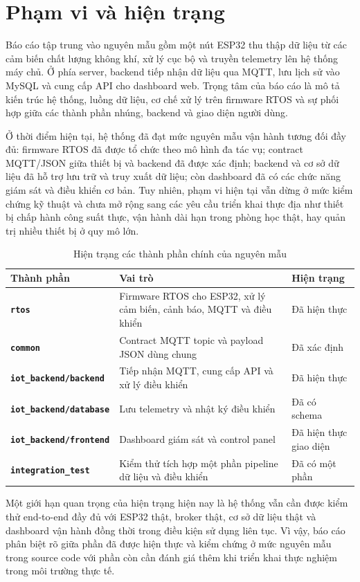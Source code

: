 \section{Phạm vi và hiện trạng}

Báo cáo tập trung vào nguyên mẫu gồm một nút ESP32 thu thập dữ liệu từ các cảm biến
chất lượng không khí, xử lý cục bộ và truyền telemetry lên hệ thống máy chủ. Ở phía
server, backend tiếp nhận dữ liệu qua MQTT, lưu lịch sử vào MySQL và cung cấp API cho
dashboard web. Trọng tâm của báo cáo là mô tả kiến trúc hệ thống, luồng dữ liệu, cơ chế
xử lý trên firmware RTOS và sự phối hợp giữa các thành phần nhúng, backend và giao diện
người dùng.

Ở thời điểm hiện tại, hệ thống đã đạt mức nguyên mẫu vận hành tương đối đầy đủ: firmware
RTOS đã được tổ chức theo mô hình đa tác vụ; contract MQTT/JSON giữa thiết bị và backend
đã được xác định; backend và cơ sở dữ liệu đã hỗ trợ lưu trữ và truy xuất dữ liệu; còn
dashboard đã có các chức năng giám sát và điều khiển cơ bản. Tuy nhiên, phạm vi hiện
tại vẫn dừng ở mức kiểm chứng kỹ thuật và chưa mở rộng sang các yêu cầu triển khai thực
địa như thiết bị chấp hành công suất thực, vận hành dài hạn trong phòng học thật, hay
quản trị nhiều thiết bị ở quy mô lớn.

\begin{table}[H]
    \centering
    \caption{Hiện trạng các thành phần chính của nguyên mẫu}
    \begin{tabularx}{\textwidth}{>{\bfseries}l X X}
        \toprule
        Thành phần & Vai trò & Hiện trạng \\
        \midrule
        \texttt{rtos} & Firmware RTOS cho ESP32, xử lý cảm biến, cảnh báo, MQTT và điều khiển & Đã hiện thực \\
        \texttt{common} & Contract MQTT topic và payload JSON dùng chung & Đã xác định \\
        \texttt{iot\_backend/backend} & Tiếp nhận MQTT, cung cấp API và xử lý điều khiển & Đã hiện thực \\
        \texttt{iot\_backend/database} & Lưu telemetry và nhật ký điều khiển & Đã có schema \\
        \texttt{iot\_backend/frontend} & Dashboard giám sát và control panel & Đã hiện thực giao diện \\
        \texttt{integration\_test} & Kiểm thử tích hợp một phần pipeline dữ liệu và điều khiển & Đã có một phần \\
        \bottomrule
    \end{tabularx}
\end{table}

Một giới hạn quan trọng của hiện trạng hiện nay là hệ thống vẫn cần được kiểm thử
end-to-end đầy đủ với ESP32 thật, broker thật, cơ sở dữ liệu thật và dashboard vận hành
đồng thời trong điều kiện sử dụng liên tục. Vì vậy, báo cáo phân biệt rõ giữa phần đã
được hiện thực và kiểm chứng ở mức nguyên mẫu trong source code với phần còn cần đánh
giá thêm khi triển khai thực nghiệm trong môi trường thực tế.
